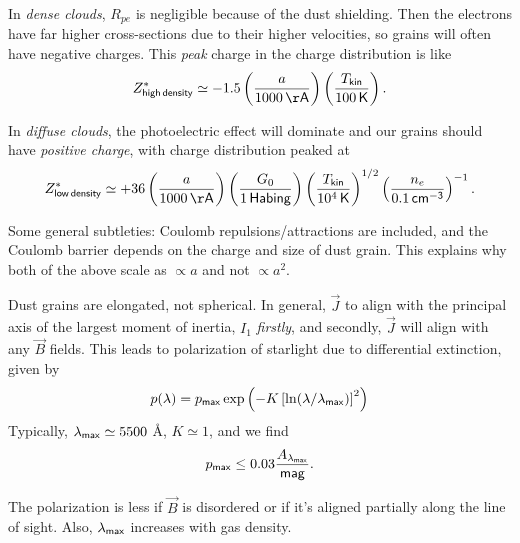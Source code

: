\documentclass{tufte-handout}
\renewcommand{\rm}{\sf}
\begin{document}
In \textit{dense clouds}, $R_{pe}$ is negligible because of the dust shielding. Then the electrons have far higher cross-sections due to their higher velocities, so grains will often have negative charges. This \textit{peak} charge in the charge distribution is like
\[Z_{\rm high\,density}^* \simeq -1.5 \left (\frac{a}{1000 \, {\rm\AA}}\right )\left (\frac{T_{\rm kin}}{100 {\rm\, K}}\right ).\]

In \textit{diffuse clouds}, the photoelectric effect will dominate and our grains should have \textit{positive charge}, with charge distribution peaked at
\[Z_{\rm low\,density}^* \simeq +36 \left (\frac{a}{1000{\rm\, \AA}}\right )\left (\frac{G_0}{1 {\rm\, Habing}}\right ) \left (\frac{T_{\rm kin}}{10^4 {\rm \, K}}\right )^{1/2} \left (\frac{n_e}{0.1 {\rm\, cm^{-3}}}\right )^{-1}. \]

Some general subtleties: Coulomb repulsions/attractions are included, and the Coulomb barrier depends on the charge and size of dust grain. This explains why both of the above scale as $\propto a$ and not $\propto a^2$.

Dust grains are elongated, not spherical. In general, $\vec J$ to align with the principal axis of the largest moment of inertia, $I_1$ \textit{firstly}, and secondly, $\vec J$ will align with any $\vec B$ fields. This leads to polarization of starlight due to differential extinction, given by
\begin{equation}
p(\lambda) = p_{\rm max} \exp \left (-K \left [\ln (\lambda/\lambda_{\rm max})\right ]^{2}\right )
\end{equation}
Typically, $\lambda_{\rm max} \simeq 5500$ \AA{}, $K \simeq 1$, and we find
\[p_{\rm max} \leq 0.03 \frac{A_{\lambda_{\rm max}}}{\rm mag}.\]

The polarization is less if $\vec B$ is disordered or if it's aligned partially along the line of sight. Also, $\lambda_{\rm max}$ increases with gas density.
\end{document}
